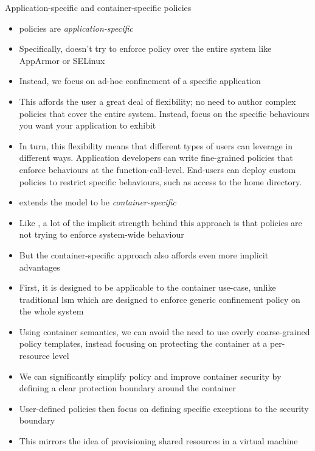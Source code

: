 \begin{inprogress}
  Application-specific and container-specific policies
  \begin{itemize}
    \item \bpfbox{} policies are \textit{application-specific}
    \item Specifically, \bpfbox{} doesn't try to enforce policy over the entire system like AppArmor or SELinux
    \item Instead, we focus on ad-hoc confinement of a specific application
    \item This affords the user a great deal of flexibility; no need to author complex policies that cover the entire system. Instead, focus on the specific behaviours you want your application to exhibit
    \item In turn, this flexibility means that different types of users can leverage \bpfbox{} in different ways. Application developers can write fine-grained policies that enforce behaviours at the function-call-level. End-users can deploy custom \bpfbox{} policies to restrict specific behaviours, such as access to the home directory.

    \item \bpfcontain{} extends the \bpfbox{} model to be \textit{container-specific}
    \item Like \bpfbox{}, a lot of the implicit strength behind this approach is that policies are not trying to enforce system-wide behaviour
    \item But the container-specific approach also affords even more implicit advantages
    \item First, it is designed to be applicable to the container use-case, unlike traditional \gls{lsm} which are designed to enforce generic confinement policy on the whole system
    \item Using container semantics, we can avoid the need to use overly coarse-grained policy templates, instead focusing on protecting the container at a per-resource level
    \item We can significantly simplify policy and improve container security by defining a clear protection boundary around the container
    \item User-defined policies then focus on defining specific exceptions to the security boundary
    \item This mirrors the idea of provisioning shared resources in a virtual machine
  \end{itemize}


\end{inprogress}
